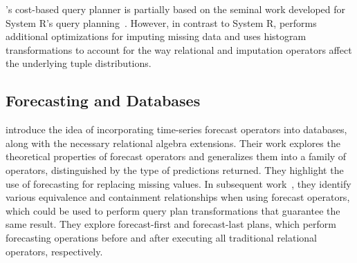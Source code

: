 
\ProjectName's cost-based query planner 
is partially based on the seminal work developed for System R's query planning~\cite{blasgen1981system}.
However, in contrast to System R, \ProjectName{} performs additional optimizations for imputing missing data and
uses histogram transformations to account for the way relational and imputation operators affect the underlying
tuple distributions.


\subsection{Forecasting and Databases}
\textcite*{parisi2011embedding} introduce the idea of incorporating time-series forecast operators into
databases, along with the necessary relational algebra extensions. Their work explores the theoretical
properties of forecast operators and generalizes them into a family of operators, distinguished by
the type of predictions returned. They highlight the use of forecasting for replacing missing values.
In subsequent work~\cite{parisi2013temporal}, they identify various equivalence and containment
relationships when using forecast operators, which could be used to perform query plan transformations that guarantee the same result. They
explore forecast-first and forecast-last plans, which perform forecasting operations before and after executing all traditional
relational operators, respectively. 

